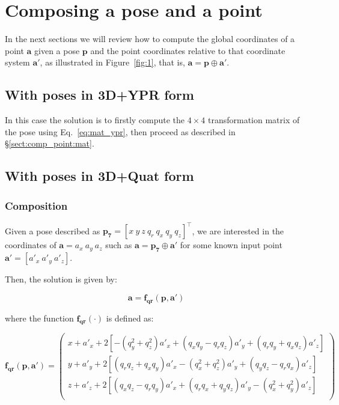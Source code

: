 \documentclass[a4paper,10pt]{report}
\begin{document}
\chapter{Composing a pose and a point}

In the next sections we will review how to compute the global coordinates of a point $\mathbf{a}$
given a pose $\mathbf{p}$ and the point coordinates relative to that coordinate system $\mathbf{a'}$,
as illustrated in Figure~\ref{fig:1}, that is, $\mathbf{a} = \mathbf{p} \oplus \mathbf{a'}$.

\section{With poses in 3D+YPR form}

In this case the solution is to firstly compute the $4 \times 4$ 
transformation matrix of the pose using Eq.~\ref{eq:mat_ypr}, then proceed 
as described in \S \ref{sect:comp_point:mat}.


\section{With poses in 3D+Quat form}

\subsection{Composition}

Given a pose described as $\mathbf{p_7} = [x ~ y ~ z ~  q_r ~ q_x ~ q_y ~ q_z ] ^ \top$, 
we are interested in the coordinates of $\mathbf{a}={a_x ~ a_y ~ a_z}$ such as
$\mathbf{a} = \mathbf{p_7} \oplus \mathbf{a'}$ for some known input point 
$\mathbf{a'} = [a'_x ~ a'_y ~ a'_z]$. 

Then, the solution is given by:

\begin{equation}
\mathbf{a} = \mathbf{f_{qr}} (\mathbf{p},\mathbf{a'})
\end{equation}

\noindent where the function $\mathbf{f_{qr}}(\cdot)$ is defined as:

\begin{equation}
\mathbf{f_{qr}} (\mathbf{p},\mathbf{a'}) = 
 \left(
\begin{array}{c}
 x + a'_x + 2 \left[-(q_y^2+ q_z^2) a'_x +(q_x q_y - q_r q_z) a'_y+(q_r q_y+q_x q_z) a'_z \right]  \\
 y + a'_y + 2 \left[(q_r q_z+  q_x q_y) a'_x-(q_x^2 +q_z^2) a'_y+(q_y q_z-q_r q_x) a'_z \right] \\
 z + a'_z + 2 \left[(q_x q_z-  q_r q_y) a'_x+(q_r q_x + q_y q_z) a'_y-(q_x^2+q_y^2) a'_z \right]  \\
\end{array}
\right)
\label{eq:quat_rot_point_func}
\end{equation}
\end{document}
